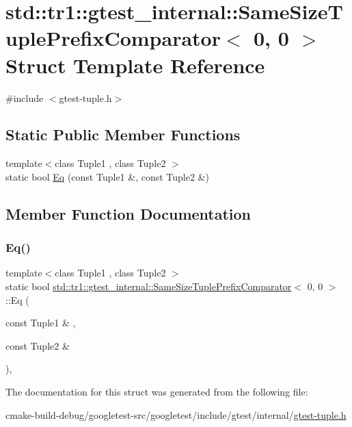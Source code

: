 \hypertarget{structstd_1_1tr1_1_1gtest__internal_1_1SameSizeTuplePrefixComparator_3_010_00_010_01_4}{}\section{std\+::tr1\+::gtest\+\_\+internal\+::Same\+Size\+Tuple\+Prefix\+Comparator$<$ 0, 0 $>$ Struct Template Reference}
\label{structstd_1_1tr1_1_1gtest__internal_1_1SameSizeTuplePrefixComparator_3_010_00_010_01_4}


{\ttfamily \#include $<$gtest-\/tuple.\+h$>$}

\subsection*{Static Public Member Functions}
\begin{DoxyCompactItemize}
\item 
{\footnotesize template$<$class Tuple1 , class Tuple2 $>$ }\\static bool \mbox{\hyperlink{structstd_1_1tr1_1_1gtest__internal_1_1SameSizeTuplePrefixComparator_3_010_00_010_01_4_a4f209822266c6bb1832c49750a11ef95}{Eq}} (const Tuple1 \&, const Tuple2 \&)
\end{DoxyCompactItemize}


\subsection{Member Function Documentation}
\mbox{\label{structstd_1_1tr1_1_1gtest__internal_1_1SameSizeTuplePrefixComparator_3_010_00_010_01_4_a4f209822266c6bb1832c49750a11ef95}} 
\subsubsection{\texorpdfstring{Eq()}{Eq()}}
{\footnotesize\ttfamily template$<$class Tuple1 , class Tuple2 $>$ \\
static bool \mbox{\hyperlink{structstd_1_1tr1_1_1gtest__internal_1_1SameSizeTuplePrefixComparator}{std\+::tr1\+::gtest\+\_\+internal\+::\+Same\+Size\+Tuple\+Prefix\+Comparator}}$<$ 0, 0 $>$\+::Eq (\begin{DoxyParamCaption}\item[{const Tuple1 \&}]{,  }\item[{const Tuple2 \&}]{ }\end{DoxyParamCaption})\hspace{0.3cm}{\ttfamily [inline]}, {\ttfamily [static]}}



The documentation for this struct was generated from the following file\+:\begin{DoxyCompactItemize}
\item 
cmake-\/build-\/debug/googletest-\/src/googletest/include/gtest/internal/\mbox{\hyperlink{gtest-tuple_8h}{gtest-\/tuple.\+h}}\end{DoxyCompactItemize}
